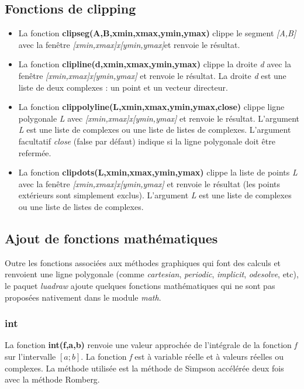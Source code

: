 \documentclass[%
10pt,%
a4paper,%
french,%
]%
{article}%
\begin{document}
\subsection{Fonctions de clipping}

\begin{itemize}
    \item La fonction \textbf{clipseg(A,B,xmin,xmax,ymin,ymax)} clippe le segment \emph{{[}A,B{]}} avec la fenêtre \emph{{[}xmin,xmax{]}x{[}ymin,ymax{]}}et renvoie le résultat.
    \item La fonction \textbf{clipline(d,xmin,xmax,ymin,ymax)} clippe la droite \emph{d} avec la fenêtre \emph{{[}xmin,xmax{]}x{[}ymin,ymax{]}} et renvoie le résultat. La droite \emph{d} est une liste de deux complexes : un point et un vecteur directeur.
    \item La fonction \textbf{clippolyline(L,xmin,xmax,ymin,ymax,close)} clippe ligne polygonale \emph{L} avec \emph{{[}xmin,xmax{]}x{[}ymin,ymax{]}} et renvoie le résultat. L'argument \emph{L} est une liste de complexes ou une liste de listes de complexes. L'argument facultatif \emph{close} (false par défaut) indique si la ligne polygonale doit être refermée.
    \item La fonction \textbf{clipdots(L,xmin,xmax,ymin,ymax)} clippe la liste de points \emph{L} avec la fenêtre \emph{{[}xmin,xmax{]}x{[}ymin,ymax{]}} et renvoie le résultat (les points extérieurs sont simplement exclus). L'argument \emph{L} est une liste de complexes ou une liste de listes de complexes.
\end{itemize}

\subsection{Ajout de fonctions mathématiques}
Outre les fonctions associées aux méthodes graphiques qui font des calculs et renvoient une ligne polygonale (comme \emph{cartesian}, \emph{periodic}, \emph{implicit}, \emph{odesolve}, etc), le paquet \emph{luadraw} ajoute quelques fonctions mathématiques qui ne sont pas proposées nativement dans le module \emph{math}.

\subsubsection{int}
La fonction \textbf{int(f,a,b)} renvoie une valeur approchée de l'intégrale de la fonction \emph{f} sur l'intervalle $[a;b]$. La fonction \emph{f} est à variable réelle et à valeurs réelles ou complexes. La méthode utilisée est la méthode de Simpson accélérée deux fois avec la méthode Romberg.
\end{document}
